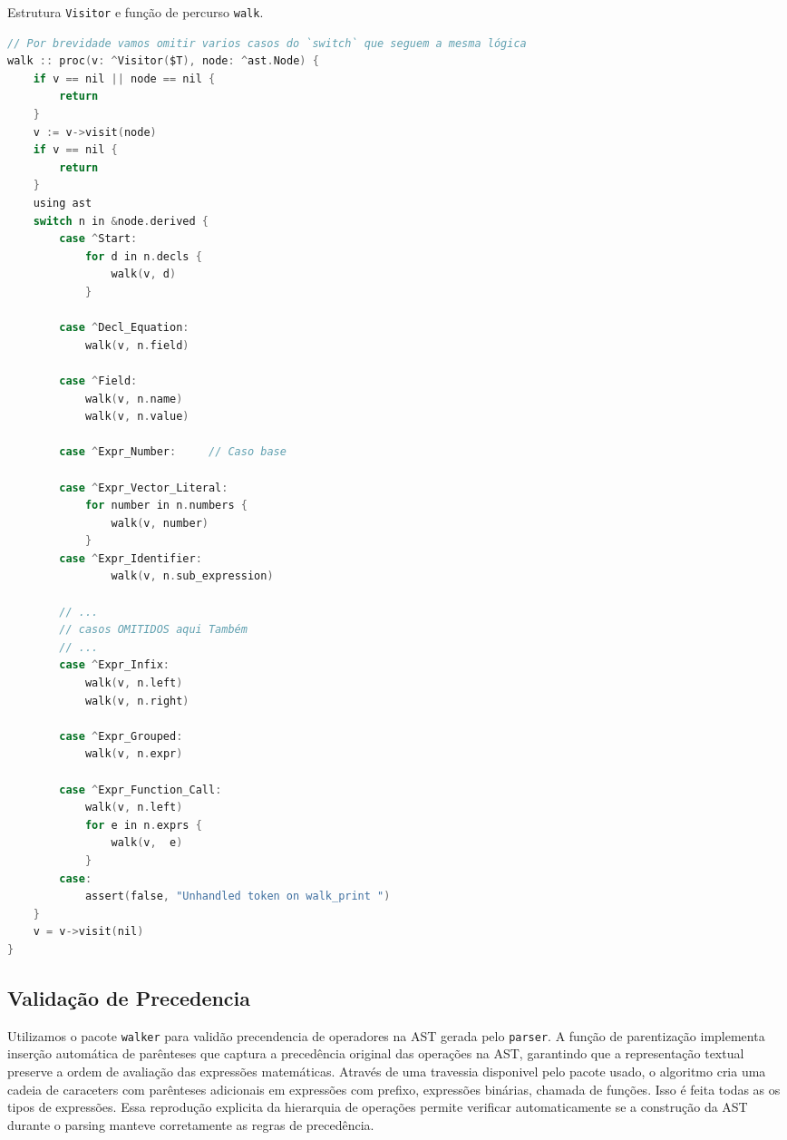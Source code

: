 \begin{codigo}[tb]
\caption{\small Estrutura \texttt{Visitor} e função de percurso \texttt{walk}. }
        \label{cod-visitor-walk}
\begin{lstlisting}[language = C]
// Por brevidade vamos omitir varios casos do `switch` que seguem a mesma lógica
walk :: proc(v: ^Visitor($T), node: ^ast.Node) {
    if v == nil || node == nil {
        return
    }
    v := v->visit(node)
    if v == nil {
        return
    }
    using ast
    switch n in &node.derived {
        case ^Start:
            for d in n.decls {
                walk(v, d)
            }

        case ^Decl_Equation:
            walk(v, n.field)

        case ^Field:
            walk(v, n.name)
            walk(v, n.value)

        case ^Expr_Number:     // Caso base

        case ^Expr_Vector_Literal:
            for number in n.numbers {
                walk(v, number)
            }
        case ^Expr_Identifier:
                walk(v, n.sub_expression)

        // ...
        // casos OMITIDOS aqui Também
        // ...
        case ^Expr_Infix:
            walk(v, n.left)
            walk(v, n.right)

        case ^Expr_Grouped:
            walk(v, n.expr)

        case ^Expr_Function_Call:
            walk(v, n.left)
            for e in n.exprs {
                walk(v,  e)
            }
        case:
            assert(false, "Unhandled token on walk_print ")
    }
    v = v->visit(nil)
}

  \end{lstlisting}
\end{codigo}


\subsection{Validação de Precedencia}
Utilizamos o pacote \texttt{walker} para validão precendencia de operadores na AST gerada pelo \texttt{parser}. A função de parentização implementa inserção automática de parênteses que captura a precedência original das operações na AST, garantindo que a representação textual preserve a ordem de avaliação das expressões matemáticas. Através de uma travessia disponivel pelo pacote usado, o algoritmo cria uma cadeia de caraceters com parênteses adicionais em expressões com prefixo, expressões binárias, chamada de funções. Isso é feita todas as os tipos de expressões. 
Essa reprodução explicita da hierarquia de operações permite verificar automaticamente se a construção da AST durante o parsing manteve corretamente as regras de precedência.

